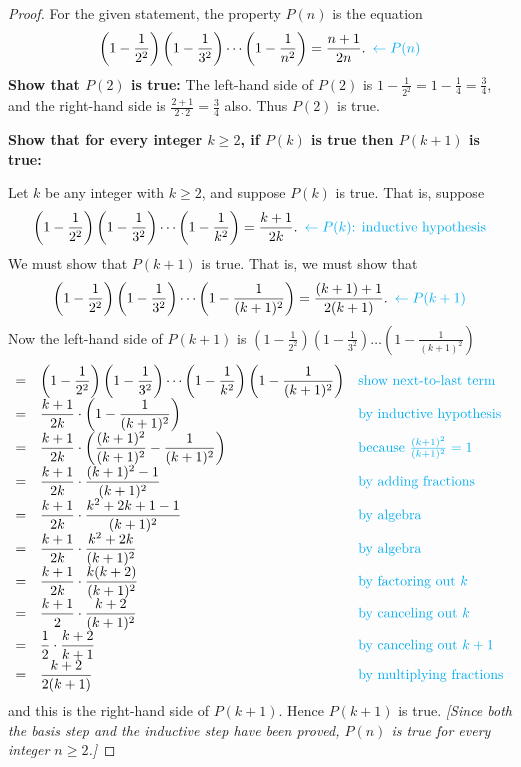 \documentclass[14pt]{extarticle}
\newcommand{\dps}{\displaystyle}
\newcommand{\from}{\leftarrow}
\newcommand{\cy}{\color{cyan}}
\begin{document}
\begin{proof}
For the given statement, the property $P(n)$ is the equation
\[
\dps \left(1 - \frac{1}{2^2}\right)\left(1 - \frac{1}{3^2}\right) \cdots \left(1 - \frac{1}{n^2}\right) = \frac{n+1}{2n}. \,\,\, {\cy \from P(n)}
\]
{\bf Show that $P(2)$ is true:} The left-hand side of $P(2)$ is $\dps 1 - \frac{1}{2^2} = 1 - \frac{1}{4} = \frac{3}{4}$, and the right-hand side is $\dps \frac{2+1}{2 \cdot 2} = \frac{3}{4}$ also. Thus $P(2)$ is true.

{\bf Show that for every integer $k \geq 2$, if $P(k)$ is true then $P(k + 1)$ is true:}

Let $k$ be any integer with $k \geq 2$, and suppose $P(k)$ is true. That is, suppose
\[
\dps \left(1 - \frac{1}{2^2}\right)\left(1 - \frac{1}{3^2}\right) \cdots \left(1 - \frac{1}{k^2}\right) = \frac{k+1}{2k}. \,\,\, {\cy \from P(k) \text{: inductive hypothesis}}
\]
We must show that $P(k + 1)$ is true. That is, we must show that
\[
\dps \left(1 - \frac{1}{2^2}\right)\left(1 - \frac{1}{3^2}\right) \cdots \left(1 - \frac{1}{(k+1)^2}\right) = \frac{(k+1)+1}{2(k+1)}. \,\,\,{\cy \from P(k+1)}
\]
Now the left-hand side of $P(k + 1)$ is $\dps \left(1 - \frac{1}{2^2}\right)\left(1 - \frac{1}{3^2}\right) \ldots \left(1 - \frac{1}{(k+1)^2}\right)$
\[
\begin{array}{lll}
= & \dps \left(1 - \frac{1}{2^2}\right)\left(1 - \frac{1}{3^2}\right) \cdots \left(1 - \frac{1}{k^2}\right) \left(1 - \frac{1}{(k+1)^2}\right) & \text{\cy show next-to-last term} \\
= & \dps \frac{k+1}{2k} \cdot \left(1 - \frac{1}{(k+1)^2}\right) & \text{\cy by inductive hypothesis} \\
= & \dps \frac{k+1}{2k} \cdot \left(\frac{(k+1)^2}{(k+1)^2} - \frac{1}{(k+1)^2}\right) & \text{\cy because $\frac{(k+1)^2}{(k+1)^2} = 1$} \\
= & \dps \frac{k+1}{2k} \cdot \frac{(k+1)^2 - 1}{(k+1)^2} & \text{\cy by adding fractions} \\
= & \dps \frac{k+1}{2k} \cdot \frac{k^2+2k+1 - 1}{(k+1)^2} & \text{\cy by algebra} \\
= & \dps \frac{k+1}{2k} \cdot \frac{k^2+2k}{(k+1)^2} & \text{\cy by algebra} \\
= & \dps \frac{k+1}{2k} \cdot \frac{k(k+2)}{(k+1)^2} & \text{\cy by factoring out $k$} \\
= & \dps \frac{k+1}{2} \cdot \frac{k+2}{(k+1)^2} & \text{\cy by canceling out $k$} \\
= & \dps \frac{1}{2} \cdot \frac{k+2}{k+1} & \text{\cy by canceling out $k+1$} \\
= & \dps \frac{k+2}{2(k+1)} & \text{\cy by multiplying fractions} 
\end{array}
\]
and this is the right-hand side of $P(k + 1)$. Hence $P(k + 1)$ is true. {\it [Since both the basis step and the inductive step have been proved, $P(n)$ is true for every integer $n \geq 2$.]}
\end{proof}
\end{document}
